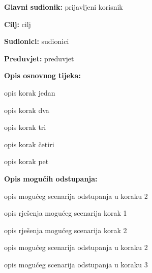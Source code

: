 					\noindent {}
					\begin{packed_item}
						
						\item \textbf{Glavni sudionik: }prijavljeni korisnik
						\item  \textbf{Cilj:} cilj
						\item  \textbf{Sudionici:} sudionici
						\item  \textbf{Preduvjet:} preduvjet
						\item  \textbf{Opis osnovnog tijeka:}
						
						\item[] \begin{packed_enum}
							
							\item opis korak jedan
							\item opis korak dva
							\item opis korak tri
							\item opis korak četiri
							\item opis korak pet
						\end{packed_enum}
						
						\item  \textbf{Opis mogućih odstupanja:}
						
						\item[] \begin{packed_item}
							
							\item[2.a] opis mogućeg scenarija odstupanja u koraku 2
							\item[] \begin{packed_enum}
								
								\item opis rješenja mogućeg scenarija korak 1
								\item opis rješenja mogućeg scenarija korak 2
								
							\end{packed_enum}
							\item[2.b] opis mogućeg scenarija odstupanja u koraku 2
							\item[3.a] opis mogućeg scenarija odstupanja  u koraku 3
							
						\end{packed_item}
					\end{packed_item}
					
